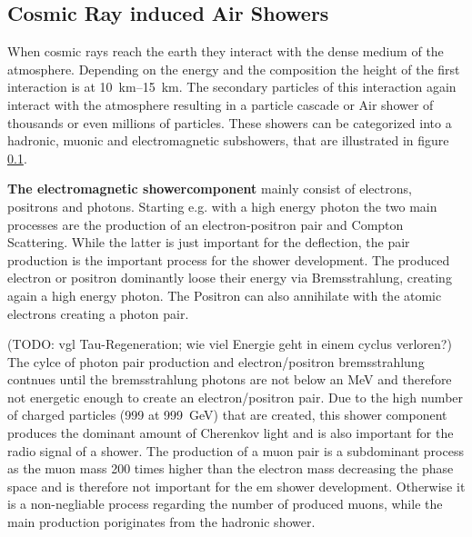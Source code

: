 
\subsection{Cosmic Ray induced Air Showers}

When cosmic rays reach the earth they interact with the dense medium of the atmosphere.
Depending on the energy and the composition the height of the first interaction is at \SIrange{10}{15}{km}.
The secondary particles of this interaction again interact with the atmosphere resulting in a particle cascade or Air shower of thousands or even millions of particles.
These showers can be categorized into a hadronic, muonic and electromagnetic subshowers, that are illustrated in figure \ref{}.


\textbf{The electromagnetic showercomponent} mainly consist of electrons, positrons and photons.
Starting e.g. with a high energy photon the two main processes are the production of an electron-positron pair and Compton Scattering.
While the latter is just important for the deflection, the pair production is the important process for the shower development.
The produced electron or positron dominantly loose their energy via Bremsstrahlung, creating again a high energy photon.
The Positron can also annihilate with the atomic electrons creating a photon pair.

(TODO: vgl Tau-Regeneration; wie viel Energie geht in einem cyclus verloren?)
The cylce of photon pair production and electron/positron bremsstrahlung contnues until the bremsstrahlung photons are not below an MeV and therefore not energetic enough to create an electron/positron pair.
Due to the high number of charged particles (\num{999} at \SI{999}{GeV}) that are created, this shower component produces the dominant amount of Cherenkov light and is also important for the radio signal of a shower.
The production of a muon pair is a subdominant process as the muon mass 200 times higher than the electron mass decreasing the phase space and is therefore not important for the em shower development.
Otherwise it is a non-negliable process regarding the number of produced muons, while the main production poriginates from the hadronic shower.

